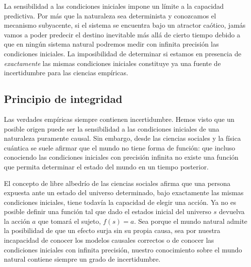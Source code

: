 \documentclass[a4paper,10pt]{book}
\theoremstyle{definition}
\begin{document}
%

La sensibilidad a las condiciones iniciales impone un l\'imite a la capacidad predictiva.
%
Por m\'as que la naturaleza sea determinista y conozcamos el mecanismo subyacente, si el sistema se encuentra bajo un atractor ca\'otico, jam\'as vamos a poder predecir el destino inevitable m\'as all\'a de cierto tiempo debido a que en ning\'un sistema natural podremos medir con infinita precisi\'on las condiciones iniciales.
%
La imposibilidad de determinar si estamos en presencia de \emph{exactamente} las mismas condiciones iniciales constituye ya una fuente de incertidumbre para las ciencias emp\'iricas.

\subsection{Principio de integridad}\label{sec:principio_integridad}

Las verdades emp\'iricas siempre contienen incertidumbre.
%
Hemos visto que un posible origen puede ser la sensibilidad a las condiciones iniciales de una naturaleza puramente causal.
%
Sin embargo, desde las ciencias sociales y la f\'isica cu\'antica se suele afirmar que el mundo no tiene forma de funci\'on: que incluso conociendo las condiciones iniciales con precisi\'on infinita no existe una funci\'on que permita determinar el estado del mundo en un tiempo posterior.


El concepto de libre albedr\'io de las ciencias sociales afirma que una persona expuesta ante un estado del universo determinado, bajo exactamente las mismas condiciones iniciales, tiene todav\'ia la capacidad de elegir una acci\'on.
%
Ya no es posible definir una funci\'on tal que dado el estados inicial del universo $s$ devuelva la acci\'on $a$ que tomar\'a el sujeto, $f(s) = a$.
%
Sea porque el mundo natural admite la posibilidad de que un efecto surja sin su propia causa, sea por nuestra incapacidad de conocer los modelos causales correctos o de conocer las condiciones iniciales con infinita precisi\'on, nuestro conocimiento sobre el mundo natural contiene siempre un grado de incertidumbre.

\end{document}
